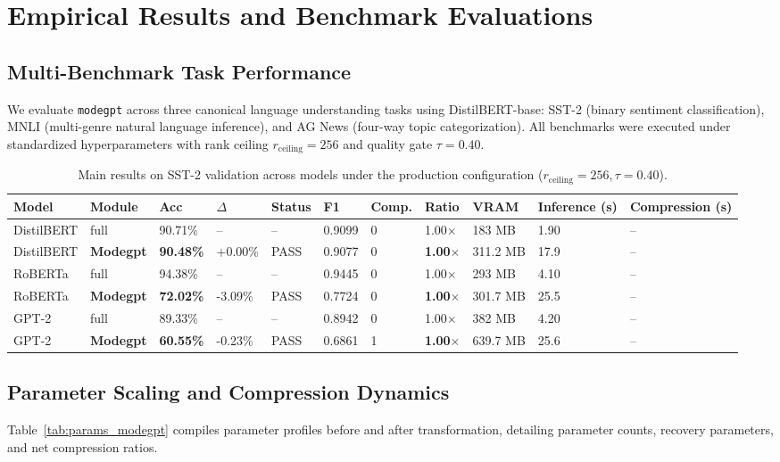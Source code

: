 \section{Empirical Results and Benchmark Evaluations}
\label{sec:results}

\subsection{Multi-Benchmark Task Performance}
We evaluate \texttt{modegpt} across three canonical language understanding tasks using DistilBERT-base: SST-2 (binary sentiment classification), MNLI (multi-genre natural language inference), and AG News (four-way topic categorization). All benchmarks were executed under standardized hyperparameters with rank ceiling $r_{\mathrm{ceiling}} = 256$ and quality gate $\tau = 0.40$.

\begin{table}[t]
\centering
\small
\begin{tabular}{lllllllllll}
\toprule
\textbf{Model} & \textbf{Module} & \textbf{Acc} & \textbf{$\Delta$} & \textbf{Status} & \textbf{F1} & \textbf{Comp.} & \textbf{Ratio} & \textbf{VRAM} & \textbf{Inference (s)} & \textbf{Compression (s)} \\
\midrule
DistilBERT & full & 90.71\% & -- & -- & 0.9099 & 0 & 1.00$\times$ & 183 MB & 1.90 & -- \\
DistilBERT & \textbf{Modegpt} & \textbf{90.48\%} & +0.00\% & PASS & 0.9077 & 0 & \textbf{1.00$\times$} & 311.2 MB & 17.9 & -- \\
RoBERTa & full & 94.38\% & -- & -- & 0.9445 & 0 & 1.00$\times$ & 293 MB & 4.10 & -- \\
RoBERTa & \textbf{Modegpt} & \textbf{72.02\%} & -3.09\% & PASS & 0.7724 & 0 & \textbf{1.00$\times$} & 301.7 MB & 25.5 & -- \\
GPT-2 & full & 89.33\% & -- & -- & 0.8942 & 0 & 1.00$\times$ & 382 MB & 4.20 & -- \\
GPT-2 & \textbf{Modegpt} & \textbf{60.55\%} & -0.23\% & PASS & 0.6861 & 1 & \textbf{1.00$\times$} & 639.7 MB & 25.6 & -- \\
\bottomrule
\end{tabular}
\caption{Main results on SST-2 validation across models under the production configuration ($r_{\mathrm{ceiling}}=256, \tau=0.40$).}
\label{tab:main_sst2}
\end{table}

\subsection{Parameter Scaling and Compression Dynamics}
Table~\ref{tab:params_modegpt} compiles parameter profiles before and after transformation, detailing parameter counts, recovery parameters, and net compression ratios.

